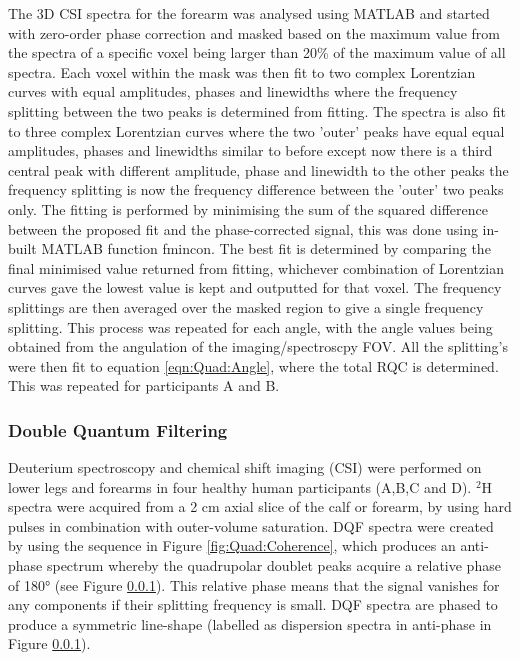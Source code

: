 \documentclass[class=article, crop=false]{standalone}
\begin{document}
The 3D CSI spectra for the forearm was analysed using MATLAB and started with zero-order phase correction and masked based on the maximum value from the spectra of a specific voxel being larger than 20\% of the maximum value of all spectra. Each voxel within the mask was then fit to two complex Lorentzian curves with equal amplitudes, phases and linewidths where the frequency splitting between the two peaks is determined from fitting. The spectra is also fit to three complex Lorentzian curves where the two 'outer' peaks have equal equal amplitudes, phases and linewidths similar to before except now there is a third central peak with different amplitude, phase and linewidth to the other peaks the frequency splitting is now the frequency difference between the 'outer' two peaks only. The fitting is performed by minimising the sum of the squared difference between the proposed fit and the phase-corrected signal, this was done using in-built MATLAB function fmincon. The best fit is determined by comparing the final minimised value returned from fitting, whichever combination of Lorentzian curves gave the lowest value is kept and outputted for that voxel. The frequency splittings are then averaged over the masked region to give a single frequency splitting. This process was repeated for each angle, with the angle values being obtained from the angulation of the imaging/spectroscpy FOV. All the splitting's were then fit to equation \ref{eqn:Quad:Angle}, where the total RQC is determined. This was repeated for participants A and B.

\subsubsection{Double Quantum Filtering}

Deuterium spectroscopy and chemical shift imaging (CSI) were performed on lower legs and forearms in four healthy human participants (A,B,C and D). $^2$H spectra were acquired from a 2 cm axial slice of the calf or forearm, by using hard pulses in combination with outer-volume saturation. DQF spectra were created by using the sequence in Figure \ref{fig:Quad:Coherence}, which produces an anti-phase spectrum whereby the quadrupolar doublet peaks acquire a relative phase of 180° (see Figure \ref{}). This relative phase means that the signal vanishes for any components if their splitting frequency is small. DQF spectra are phased to produce a symmetric line-shape (labelled as dispersion spectra in anti-phase in Figure \ref{}).  
\end{document}
